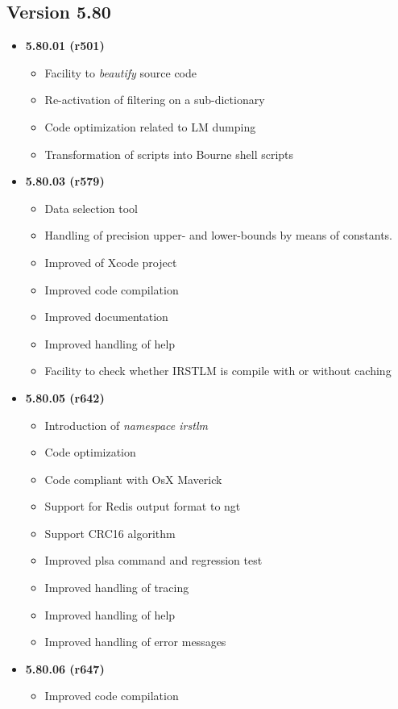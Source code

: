 \subsection{Version 5.80}
\begin{itemize}
\item {\bf 5.80.01 (r501)}
\begin{itemize}
\item Facility to {\em beautify} source code
\item Re-activation of filtering on a sub-dictionary
\item Code optimization related to LM dumping
\item Transformation of scripts into Bourne shell scripts 
\end{itemize}
\item {\bf 5.80.03 (r579)}
\begin{itemize}
\item Data selection tool
\item Handling of precision upper- and lower-bounds by means of constants.
\item Improved of Xcode project
\item Improved code compilation
\item Improved documentation
\item Improved handling of help
\item Facility to check whether IRSTLM is compile with or without caching
\end{itemize}
\item {\bf 5.80.05 (r642)}
\begin{itemize}
\item Introduction of {\em namespace irstlm}
\item Code optimization
\item Code compliant with OsX Maverick
\item Support for Redis output format to ngt
\item Support CRC16 algorithm
\item Improved plsa command and regression test
\item Improved handling of tracing
\item Improved handling of help
\item Improved handling of error messages
\end{itemize}
\item {\bf 5.80.06 (r647)}
\begin{itemize}
\item Improved code compilation

\end{itemize}
\end{itemize}
